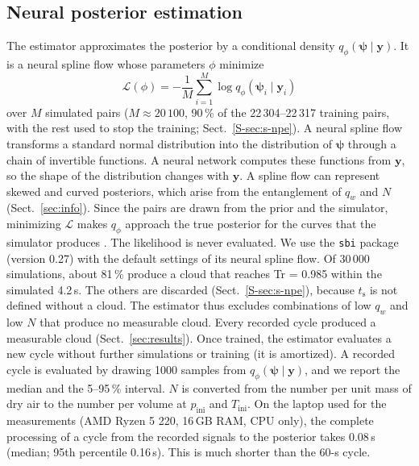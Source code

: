 \documentclass[preprint,review,12pt,authoryear]{elsarticle}
\begin{document}
\subsection{Neural posterior estimation}
\label{sec:npe}
The estimator approximates the posterior by a conditional density $q_\phi(\bm{\psi} \mid \bm{y})$. It is a
neural spline flow \citep{durkan2019neural} whose parameters $\phi$ minimize
\begin{equation}
\mathcal{L}(\phi) = -\frac{1}{M}\sum_{i=1}^{M} \log q_\phi(\bm{\psi}_i \mid \bm{y}_i)
\label{eq:npe}
\end{equation}
over $M$ simulated pairs ($M \approx 20\,100$, 90\,\% of the 22\,304--22\,317 training pairs, with the rest
used to stop the training; Sect.~\ref{S-sec:s-npe}).
A neural spline flow transforms a standard normal distribution into the distribution of $\bm{\psi}$ through
a chain of invertible functions. A neural network computes these functions from $\bm{y}$, so the shape of
the distribution changes with $\bm{y}$.
A spline flow can represent skewed and curved posteriors, which arise from the entanglement of $q_w$
and $N$ (Sect.~\ref{sec:info}).
Since the pairs are drawn from the prior and the simulator, minimizing $\mathcal{L}$ makes
$q_\phi$ approach the true posterior for the curves that the simulator produces
\citep{papamakarios2016fast,greenberg2019automatic}.
The likelihood is never evaluated.
We use the \texttt{sbi} package \citep{tejerocantero2020sbi,boelts2025sbi} (version 0.27) with the
default settings of its neural spline flow.
Of 30\,000 simulations, about 81\,\% produce a cloud that reaches Tr = 0.985 within the simulated 4.2\,s.
The others are discarded (Sect.~\ref{S-sec:s-npe}), because $t_\mathrm{s}$ is not defined without a cloud.
The estimator thus excludes combinations of low $q_w$ and low $N$ that produce no measurable cloud.
Every recorded cycle produced a measurable cloud (Sect.~\ref{sec:results}).
Once trained, the estimator evaluates a new cycle without further simulations or training (it is
amortized). A recorded cycle is evaluated by drawing 1000 samples from
$q_\phi(\bm{\psi} \mid \bm{y})$, and we report the
median and the 5--95\,\% interval.
$N$ is converted from the number per unit mass of dry air to the number per volume at
$p_\mathrm{ini}$ and $T_\mathrm{ini}$.
On the laptop used for the measurements (AMD Ryzen 5 220, 16\,GB RAM, CPU only),
the complete processing of a cycle from the recorded signals to the posterior takes 0.08\,s
(median; 95th percentile 0.16\,s).
This is much shorter than the 60-s cycle.
\end{document}
